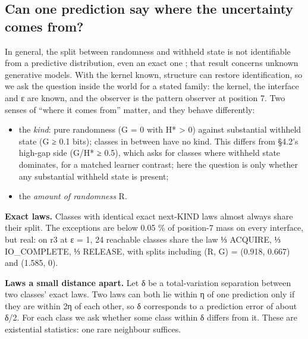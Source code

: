 \documentclass[10pt]{article}
\providecommand{\tightlist}{\setlength{\itemsep}{0pt}\setlength{\parskip}{0pt}}
\begin{document}
\hypertarget{can-one-prediction-say-where-the-uncertainty-comes-from}{%
\subsection{Can one prediction say where the uncertainty comes from?}\label{can-one-prediction-say-where-the-uncertainty-comes-from}}

In general, the split between randomness and withheld state is not identifiable from a predictive distribution, even an
exact one \citep{bergna2026decoupled}; that result concerns unknown generative models. With the kernel known, structure can
restore identification, so we ask the question inside the world for a stated family: the kernel, the interface and ε are
known, and the observer is the pattern observer at position 7. Two senses of ``where it comes from'' matter, and they
behave differently:

\begin{itemize}
\tightlist
\item
  the \emph{kind}: pure randomness (G = 0 with H* \textgreater{} 0) against substantial withheld state (G ≥ 0.1 bits); classes in
  between have no kind. This differs from §4.2's high-gap side (G/H* ≥ 0.5), which asks for classes where withheld
  state dominates, for a matched learner contrast; here the question is only whether any substantial withheld state
  is present;
\item
  the \emph{amount of randomness} R.
\end{itemize}

\textbf{Exact laws.} Classes with identical exact next-KIND laws almost always share their split. The exceptions are below
0.05 \% of position-7 mass on every interface, but real: on r3 at ε = 1, 24 reachable classes share the law ⅓ ACQUIRE,
⅓ IO\_COMPLETE, ⅓ RELEASE, with splits including (R, G) = (0.918, 0.667) and (1.585, 0).

\textbf{Laws a small distance apart.} Let δ be a total-variation separation between two classes' exact laws. Two laws can both
lie within η of one prediction only if they are within 2η of each other, so δ corresponds to a prediction error of about
δ/2. For each class we ask whether some class within δ differs from it. These are existential statistics: one rare
neighbour suffices.
\end{document}
